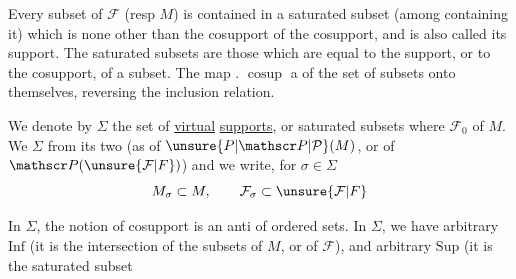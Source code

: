 
Every subset of $\mathcal F$ (resp $M$) is contained in a  saturated subset (among  containing it) which  is none other than the cosupport of the cosupport, and is also called its support. The saturated subsets are those which are equal to the support, or to the cosupport, of a subset. The map . $\operatorname{cosup}$  a  of the set of  subsets onto themselves, reversing the inclusion relation.

We denote by $\Sigma$ the set of \uline{virtual} \uline{supports}, or saturated subsets
where  $\mathcal F_0$ of $M$.   We  $\Sigma$ from  its two 
 (as  of $\unsure{P|\mathscr P|\mathcal P}(M)$, or of $\mathscr P(\unsure{\mathcal F|F})$) and we write, for $\sigma\in\Sigma$
\[
M_\sigma\subset M,\qquad\mathcal F_\sigma\subset\unsure{\mathcal F|F}
\]

In $\Sigma$,  the notion of cosupport is an anti of ordered sets. In $\Sigma$, we have arbitrary $\mathrm{Inf}$ (it is the intersection of the subsets of $M$, or of $\mathcal F$), and arbitrary $\mathrm{Sup}$ (it is the saturated subset
